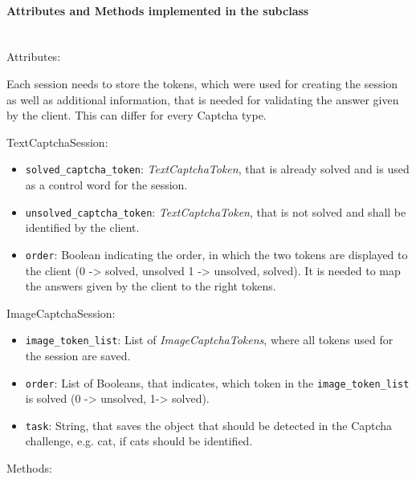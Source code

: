 \paragraph{Attributes and Methods implemented in the subclass} \mbox{} \\
Attributes:

Each session needs to store the tokens, which were used for creating the session as well as additional information, that is needed for validating the answer given by the client. This can differ for every Captcha type. 

TextCaptchaSession:

\begin{itemize} 
\item \verb|solved_captcha_token|: \emph{TextCaptchaToken}, that is already solved and is used as a control word for the session.
\item \verb|unsolved_captcha_token|: \emph{TextCaptchaToken}, that is not solved and shall be identified by the client.
\item \verb|order|: Boolean indicating the order, in which the two tokens are displayed to the client (0 -> solved, unsolved 1 -> unsolved, solved). It is needed to map the answers given by the client to the right tokens.
\end{itemize}


ImageCaptchaSession:

\begin{itemize}
\item \verb|image_token_list|: List of \emph{ImageCaptchaTokens}, where all tokens used for the session are saved.
\item \verb|order|: List of Booleans, that indicates, which token in the \verb|image_token_list| is solved (0 -> unsolved, 1-> solved).
\item \verb|task|: String, that saves the object that should be detected in the Captcha challenge, e.g. cat, if cats should be identified.
\end{itemize}

Methods: 

